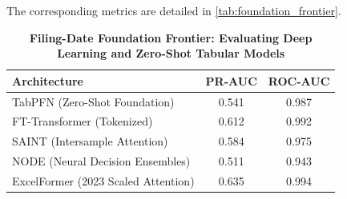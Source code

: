 

The corresponding metrics are detailed in \autoref{tab:foundation_frontier}.

\begin{table}[htbp]
\centering
\caption{\textbf{Filing-Date Foundation Frontier: Evaluating Deep Learning and Zero-Shot Tabular Models}}
\label{tab:foundation_frontier}
\begin{tabular}{lcc}
\toprule
\textbf{Architecture} & \textbf{PR-AUC} & \textbf{ROC-AUC} \\
\midrule
TabPFN (Zero-Shot Foundation) & 0.541 & 0.987 \\
FT-Transformer (Tokenized) & 0.612 & 0.992 \\
SAINT (Intersample Attention) & 0.584 & 0.975 \\
NODE (Neural Decision Ensembles) & 0.511 & 0.943 \\
ExcelFormer (2023 Scaled Attention) & 0.635 & 0.994 \\
\bottomrule
\end{tabular}
\end{table}
